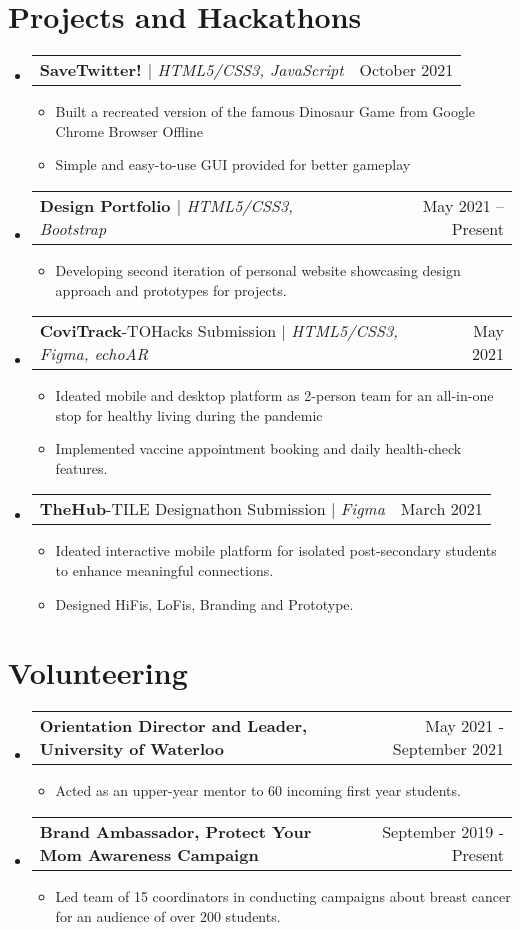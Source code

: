 \documentclass[letterpaper,11pt]{article}
\makeatletter
\newcommand{\resumeItem}[1]{
  \item\small{
    {#1 \vspace{-2pt}}
  }
}
\newcommand{\resumeProjectHeading}[2]{
    \item
    \begin{tabular*}{0.97\textwidth}{l@{\extracolsep{\fill}}r}
      \small#1 & #2 \\
    \end{tabular*}\vspace{-7pt}
}
\newcommand{\resumeSubHeadingListStart}{\begin{itemize}[leftmargin=0.15in, label={}]}
\newcommand{\resumeSubHeadingListEnd}{\end{itemize}}
\newcommand{\resumeItemListStart}{\begin{itemize}}
\newcommand{\resumeItemListEnd}{\end{itemize}\vspace{-5pt}}
\makeatother
\begin{document}
\section{Projects and Hackathons}
    \resumeSubHeadingListStart
     \resumeProjectHeading
          {\textbf{SaveTwitter! {\href{https://github.com/NandiniMeh/save-twitter-game}{\faGithub}}} $|$ \emph{HTML5/CSS3, JavaScript}}{October 2021}
          \resumeItemListStart
            \resumeItem{Built a recreated version of the famous Dinosaur Game from Google Chrome Browser Offline}
            \resumeItem{Simple and easy-to-use GUI provided for better gameplay}
          \resumeItemListEnd
     \resumeProjectHeading
          {\textbf{Design Portfolio {\href{https://github.com/NandiniMeh/design_portfolio_iteration01}{\faGithub}}} $|$ \emph{HTML5/CSS3, Bootstrap} }{May 2021 -- Present}
          \resumeItemListStart
            \resumeItem{Developing second iteration of personal website showcasing design approach and prototypes for projects.}
          \resumeItemListEnd
     \resumeProjectHeading
          {\textbf{CoviTrack}-TOHacks Submission {\href{https://github.com/NandiniMeh/CoviTrack}{\faGithub}} $|$ \emph{HTML5/CSS3, Figma, echoAR}}{May 2021}
          \resumeItemListStart
            \resumeItem{Ideated mobile and desktop platform as 2-person team for an all-in-one stop for healthy living during the pandemic}
            \resumeItem{Implemented vaccine appointment booking and daily health-check features.}
          \resumeItemListEnd
     \resumeProjectHeading
          {\textbf{TheHub}-TILE Designathon Submission {\href{https://github.com/NandiniMeh/TheHub}{\faGithub}} $|$ \emph{Figma}}{March 2021}
          \resumeItemListStart
            \resumeItem{Ideated interactive mobile platform for isolated post-secondary students to enhance meaningful connections.}
            \resumeItem{Designed HiFis, LoFis, Branding and Prototype.}
          \resumeItemListEnd
    \resumeSubHeadingListEnd

\section{Volunteering}
  \resumeSubHeadingListStart
    \resumeProjectHeading
      {\textbf {Orientation Director and Leader, University of Waterloo}}{May 2021 - September 2021}
      \resumeItemListStart
            \resumeItem{Acted as an upper-year mentor to 60 incoming first year students.}
          \resumeItemListEnd
    \resumeProjectHeading
      {\textbf {Brand Ambassador, Protect Your Mom Awareness Campaign}}{September 2019 - Present}
      \resumeItemListStart
            \resumeItem{Led team of 15 coordinators in conducting campaigns about breast cancer for an audience of over 200 students.}
          \resumeItemListEnd
  \resumeSubHeadingListEnd
\end{document}
